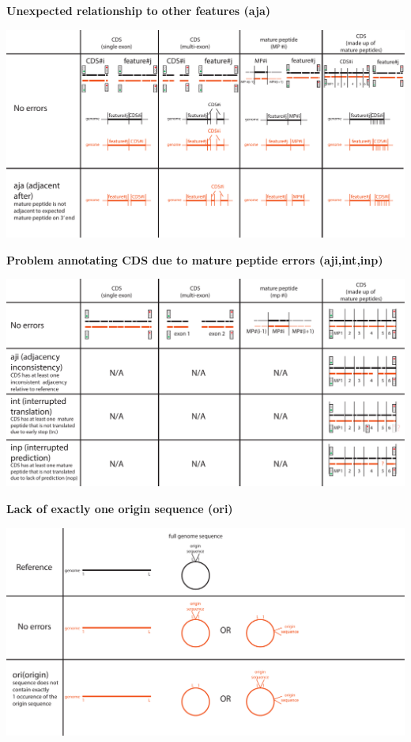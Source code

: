 \documentclass[landscape]{slides}
\begin{document}
\begin{slide}
\begin{center}
\textbf{Unexpected relationship to other features (aja)}
\vspace{0.5in}

\includegraphics[width=10in]{figs/error-7-aja}
\end{center}
\vfill
\end{slide}
\begin{slide}
\begin{center}
\textbf{Problem annotating CDS due to mature peptide errors (aji,int,inp)}
\vspace{0.5in}

\includegraphics[width=10in]{figs/error-8-aji-int-inp}
\end{center}
\vfill
\end{slide}
\begin{slide}
\begin{center}
\textbf{Lack of exactly one origin sequence (ori)}
\vspace{0.5in}

\includegraphics[width=10in]{figs/error-9-ori}
\end{center}
\vfill
\end{slide}
\end{document}
